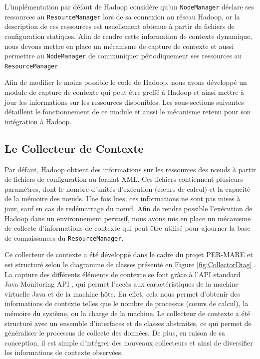 L'implémentation par défaut de Hadoop considère qu'un \texttt{NodeManager} déclare ses ressources au \texttt{ResourceManager} lors de sa connexion au réseau Hadoop, or la description de ces ressources est usuellement obtenue à partir de fichiers de configuration statiques. Afin de rendre cette information de contexte dynamique, nous devons mettre en place un mécanisme de capture de contexte et aussi permettre au \texttt{NodeManager} de communiquer périodiquement ses ressources au \texttt{ResourceManager}. 

Afin de modifier le moins possible le code de Hadoop, nous avons développé un module de capture de contexte qui peut être greffé à Hadoop et ainsi mettre à jour les informations sur les ressources disponibles. Les sous-sections suivantes détaillent le fonctionnement de ce module et aussi le mécanisme retenu pour son intégration à Hadoop.

\subsection{Le Collecteur de Contexte\label{sec:gestionnairecontexte}}
Par défaut, Hadoop obtient des informations sur les ressources des n{\oe}uds à partir de fichiers de configuration au format XML. Ces fichiers contiennent plusieurs paramètres, dont le nombre d'unités d'exécution (c{\oe}urs de calcul) et la capacité de la mémoire des n{\oe}uds. Une fois lues, ces informations ne sont pas mises à jour, sauf en cas de redémarrage du n{\oe}ud. Afin de rendre possible l'exécution de Hadoop dans un environnement pervasif, nous avons mis en place un mécanisme de collecte d'informations de contexte qui peut être utilisé pour ajourner la base de connaissances du \texttt{ResourceManager}.

Ce collecteur de contexte a été développé dans le cadre du projet PER-MARE\cite{PER-MARE} et est structuré selon le diagramme de classes présenté en Figure \ref{fig:CollectorDiag} \cite{UBICOMM2014}. La capture des différents éléments de contexte se font grâce à l'API standard Java Monitoring API \cite{Oracle}, qui permet l'accès aux caractéristiques de la machine virtuelle Java et de la machine hôte. En effet, cela nous permet d'obtenir des informations de contexte telles que le nombre de processus (c{\oe}urs de calcul), la mémoire du système, ou la charge de la machine. Le collecteur de contexte a été structuré avec un ensemble d'interfaces et de classes abstraites, ce qui permet de généraliser le processus de collecte des données. De plus, en raison de sa conception, il est simple d'intégrer des nouveaux collecteurs et ainsi de diversifier les informations de contexte observées.

